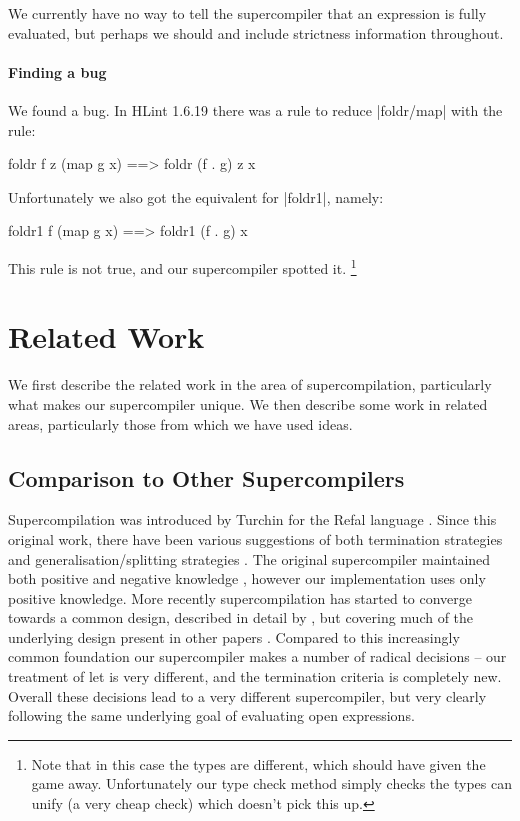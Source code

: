 \documentclass[draft]{sigplanconf}
\begin{document}
We currently have no way to tell the supercompiler that an expression is fully evaluated, but perhaps we should and include strictness information throughout.

\paragraph{Finding a bug}

We found a bug. In HLint 1.6.19 there was a rule to reduce |foldr/map| with the rule:

\begin{code}
foldr f z (map g x) ==> foldr (f . g) z x
\end{code}

Unfortunately we also got the equivalent for |foldr1|, namely:

\begin{code}
foldr1 f (map g x) ==> foldr1 (f . g) x
\end{code}

This rule is not true, and our supercompiler spotted it. \footnote{Note that in this case the types are different, which should have given the game away. Unfortunately our type check method simply checks the types can unify (a very cheap check) which doesn't pick this up.}

\section{Related Work}

We first describe the related work in the area of supercompilation, particularly what makes our supercompiler unique. We then describe some work in related areas, particularly those from which we have used ideas.

\subsection{Comparison to Other Supercompilers}
\label{sec:comparison}

Supercompilation \cite{supercompilation,turchin:experiments} was introduced by Turchin for the Refal language \cite{refal}. Since this original work, there have been various suggestions of both termination strategies and generalisation/splitting strategies \cite{turchin:generalisation,sorensen:supercompilation,leuschel:homeomorphic}. The original supercompiler maintained both positive and negative knowledge \cite{secher:perfect_supercompilation}, however our implementation uses only positive knowledge. More recently supercompilation has started to converge towards a common design, described in detail by \citet{klyuchnikov:hosc}, but covering much of the underlying design present in other papers \cite{mitchell:ifl2007post,jonsson:supercompilationpopl,more?}. Compared to this increasingly common foundation our supercompiler makes a number of radical decisions -- our treatment of let is very different, and the termination criteria is completely new. Overall these decisions lead to a very different supercompiler, but very clearly following the same underlying goal of evaluating open expressions.
\end{document}
